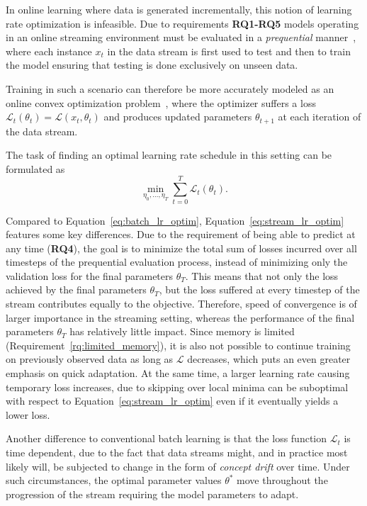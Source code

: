 \documentclass[letterpaper]{article} %
\begin{document}
In online learning where data is generated incrementally, this notion of learning rate optimization is infeasible.
Due to requirements \textbf{RQ1-RQ5} models operating in an online streaming environment must be evaluated in a \textit{prequential} manner~\cite{bifetMOAMassiveOnline2010}, where each instance $x_t$ in the data stream is first used to test and then to train the model ensuring that testing is done exclusively on unseen data.

Training in such a scenario can therefore be more accurately modeled as an online convex optimization problem~\cite{shalev-shwartzOnlineLearningOnline2011,hazanIntroductionOnlineConvex2016}, where the optimizer suffers a loss $\mathcal{L}_t(\theta_t) = \mathcal{L}(x_t, \theta_{t})$ and produces updated parameters $\theta_{t+1}$ at each iteration of the data stream.

The task of finding an optimal learning rate schedule in this setting can be formulated as
\begin{equation}
	\label{eq:stream_lr_optim}
	\min_{\eta_0, \ldots, \eta_T} \sum_{t=0}^{T} \mathcal{L}_t(\theta_t).
\end{equation}

Compared to Equation~\eqref{eq:batch_lr_optim}, Equation~\eqref{eq:stream_lr_optim} features some key differences.
Due to the requirement of being able to predict at any time (\textbf{RQ4}), the goal is to minimize the total sum of losses incurred over all timesteps of the prequential evaluation process, instead of minimizing only the validation loss for the final parameters $\theta_T$.
This means that not only the loss achieved by the final parameters $\theta_T$, but the loss suffered at every timestep of the stream contributes equally to the objective.
Therefore, speed of convergence is of larger importance in the streaming setting, whereas the performance of the final parameters $\theta_T$ has relatively little impact.
Since memory is limited (Requirement~\ref{rq:limited_memory}), it is also not possible to continue training on previously observed data as long as $\mathcal{L}$ decreases, which puts an even greater emphasis on quick adaptation.
At the same time, a larger learning rate causing temporary loss increases, due to skipping over local minima can be suboptimal with respect to Equation~\eqref{eq:stream_lr_optim} even if it eventually yields a lower loss.

Another difference to conventional batch learning is that the loss function $\mathcal{L}_t$ is time dependent, due to the fact that data streams might, and in practice most likely will, be subjected to change in the form of \textit{concept drift}
over time.
Under such circumstances, the optimal parameter values $\theta^*$ move throughout the progression of the stream requiring the model parameters to adapt.
\end{document}
